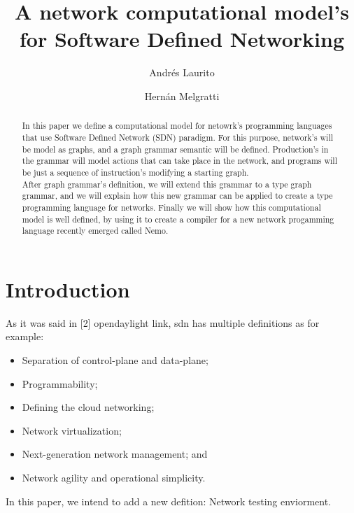 \documentclass[envcountsect,runningheads]{llncs}
\title{A network computational model's \\ for Software Defined Networking}
\author{Andr\'es  Laurito\inst{1}  \and
        Hern\'an Melgratti\inst{2}}
\institute{
Departamento de Computac\'on - FCEN -UBA\\
 \email{andy.laurito@gmail.com} }
\begin{document}
\maketitle

\begin{abstract}
 In this paper we define a computational model for netowrk's programming languages 
 that use Software Defined Network (SDN) paradigm. For this purpose, 
 network's will be model as graphs, and a graph grammar semantic will be defined. 
 Production's in the grammar will model actions that can take place in the network, and programs 
 will be just a sequence of instruction's modifying a starting graph. \\
 After graph grammar's definition, we will extend this grammar to a type graph grammar, and we 
 will explain how this new grammar can be applied to create a type programming language 
 for networks. Finally we will show how this computational model is well defined, by using it to 
 create a compiler for a new network progamming language recently emerged called Nemo.
 \end{abstract}

\section{Introduction}
 As it was said in [2] {opendaylight link}, sdn has multiple definitions as for example:
 \begin{itemize}
   \item Separation of control-plane and data-plane;
   \item Programmability;
   \item Defining the cloud networking;
   \item Network virtualization;
   \item Next-generation network management; and
   \item Network agility and operational simplicity.
 \end{itemize}
 In this paper, we intend to add a new defition: Network testing enviorment.\\
\end{document}
